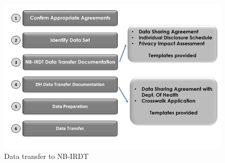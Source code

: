\documentclass[
]{book}
\begin{document}
\begin{figure}
\includegraphics[width=1\linewidth]{./assets/nbirdt/nbirdtfigure1web} \caption{Data transfer to NB-IRDT}\label{fig:nbirdtfigure1}
\end{figure}
\end{document}

